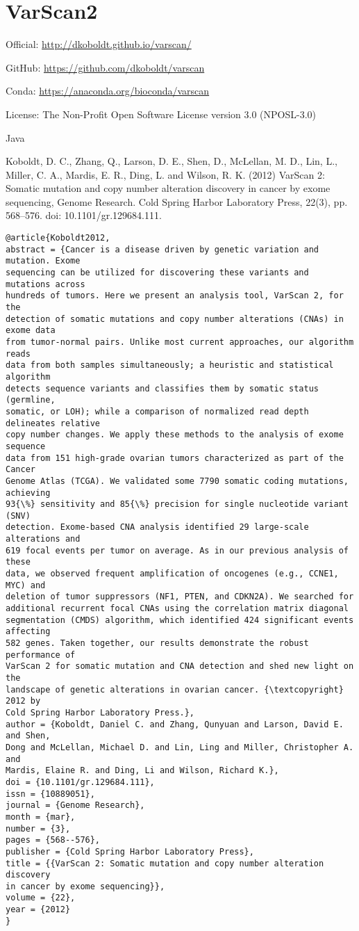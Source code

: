 \documentclass[]{article}
\begin{document}
\section{VarScan2}


Official: \url{http://dkoboldt.github.io/varscan/}

GitHub: \url{https://github.com/dkoboldt/varscan}

Conda: \url{https://anaconda.org/bioconda/varscan}

License: The Non-Profit Open Software License version 3.0 (NPOSL-3.0)

Java

Koboldt, D. C., Zhang, Q., Larson, D. E., Shen, D., McLellan, M. D., Lin, L., Miller, C. A., Mardis, E. R., Ding, L. and Wilson, R. K. (2012) VarScan 2: Somatic mutation and copy number alteration discovery in cancer by exome sequencing, Genome Research. Cold Spring Harbor Laboratory Press, 22(3), pp. 568–576. doi: 10.1101/gr.129684.111.

\begin{verbatim}
@article{Koboldt2012,
abstract = {Cancer is a disease driven by genetic variation and mutation. Exome
sequencing can be utilized for discovering these variants and mutations across
hundreds of tumors. Here we present an analysis tool, VarScan 2, for the
detection of somatic mutations and copy number alterations (CNAs) in exome data
from tumor-normal pairs. Unlike most current approaches, our algorithm reads
data from both samples simultaneously; a heuristic and statistical algorithm
detects sequence variants and classifies them by somatic status (germline,
somatic, or LOH); while a comparison of normalized read depth delineates relative
copy number changes. We apply these methods to the analysis of exome sequence
data from 151 high-grade ovarian tumors characterized as part of the Cancer
Genome Atlas (TCGA). We validated some 7790 somatic coding mutations, achieving
93{\%} sensitivity and 85{\%} precision for single nucleotide variant (SNV)
detection. Exome-based CNA analysis identified 29 large-scale alterations and
619 focal events per tumor on average. As in our previous analysis of these
data, we observed frequent amplification of oncogenes (e.g., CCNE1, MYC) and
deletion of tumor suppressors (NF1, PTEN, and CDKN2A). We searched for
additional recurrent focal CNAs using the correlation matrix diagonal
segmentation (CMDS) algorithm, which identified 424 significant events affecting
582 genes. Taken together, our results demonstrate the robust performance of
VarScan 2 for somatic mutation and CNA detection and shed new light on the
landscape of genetic alterations in ovarian cancer. {\textcopyright} 2012 by
Cold Spring Harbor Laboratory Press.},
author = {Koboldt, Daniel C. and Zhang, Qunyuan and Larson, David E. and Shen,
Dong and McLellan, Michael D. and Lin, Ling and Miller, Christopher A. and
Mardis, Elaine R. and Ding, Li and Wilson, Richard K.},
doi = {10.1101/gr.129684.111},
issn = {10889051},
journal = {Genome Research},
month = {mar},
number = {3},
pages = {568--576},
publisher = {Cold Spring Harbor Laboratory Press},
title = {{VarScan 2: Somatic mutation and copy number alteration discovery
in cancer by exome sequencing}},
volume = {22},
year = {2012}
}

\end{verbatim}
\end{document}
